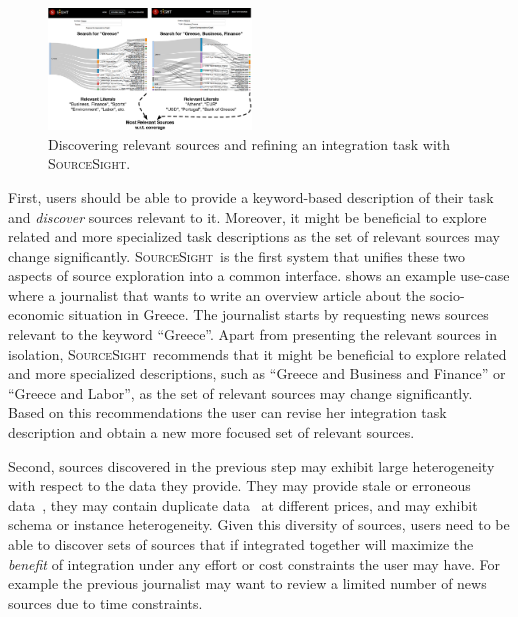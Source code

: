 \documentclass{vldb}
\newcommand\system{\textsc{SourceSight}}
\begin{document}
\begin{figure}
	\begin{center}
	\includegraphics[trim=0 0 0 60, clip,width=0.48\textwidth]{fig/exploreCor}
	\vspace{-20pt}
	\caption{Discovering relevant sources and refining an integration task with \system.}
	\label{fig:exploration}
	\end{center}
	\vspace{-25pt}
\end{figure}


First, users should be able to provide a keyword-based description of their task and {\em discover} sources relevant to it. Moreover, it might be beneficial to explore related and more specialized task descriptions as the set of relevant sources may change significantly. \system~is the first system that unifies these two aspects of source exploration into  a common interface.  shows an example use-case where a journalist that wants to write an overview article about the socio-economic situation in Greece. The journalist starts by requesting news sources relevant to the keyword ``Greece''. Apart from presenting the relevant sources in isolation, \system~recommends that it might be beneficial to explore related and more specialized descriptions, such as ``Greece and Business and Finance'' or ``Greece and Labor'', as the set of relevant sources may change significantly. Based on this recommendations the user can revise her integration task description and obtain a new more focused set of relevant sources.

Second, sources discovered in the previous step may exhibit large heterogeneity with respect to the data they provide. They may provide stale or erroneous data~\cite{Dong_vldb:2009, li:2012}, they may contain duplicate data~\cite{bronzi:2013, li:2012} at different prices, and may exhibit schema or instance heterogeneity. Given this diversity of sources, users need to be able to discover sets of sources that if integrated together will maximize the {\em benefit} of integration under any effort or cost constraints the user may have. For example the previous journalist may want to review a limited number of news sources due to time constraints. 
\end{document}
